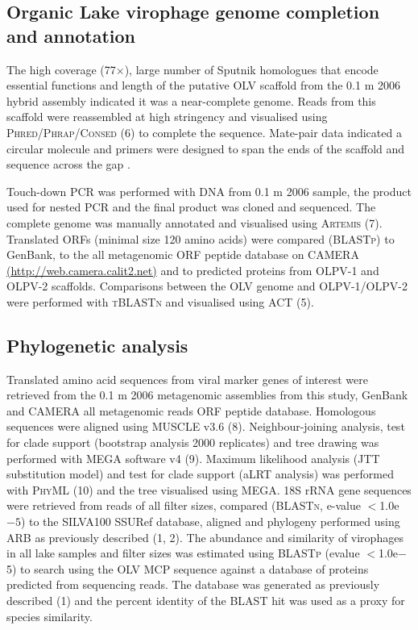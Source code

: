 \subsection[Genome completion and annotation]{Organic Lake virophage genome completion and annotation}
The high coverage (77$\times$), large number of Sputnik homologues that encode essential functions and length of the putative \ac{OLV} scaffold from the 0.1 \textmu{}m 2006 hybrid assembly indicated it was a near-complete genome. 
Reads from this scaffold were reassembled at high stringency and visualised using \textsc{Phred/Phrap/Consed} (6) to complete the sequence. 
Mate-pair data indicated a circular molecule and primers were designed to span the ends of the scaffold and sequence across the gap .
 
Touch-down \ac{PCR} was performed with \textsc{DNA} from 0.1 \textmu{}m 2006 sample, the product used for nested \ac{PCR} and the final product was cloned and sequenced. 
The complete genome was manually annotated and visualised using \textsc{Artemis} (7). 
Translated \acp{ORF} (minimal size 120 amino acids) were compared (\textsc{BLASTp}) to GenBank, to the all metagenomic \ac{ORF} peptide database on \ac{CAMERA} \url{(http://web.camera.calit2.net)} and to predicted proteins from \textsc{OLPV}-1 and \textsc{OLPV}-2 scaffolds. 
Comparisons between the \ac{OLV} genome and \textsc{OLPV}-1/\textsc{OLPV}-2 were performed with \textsc{tBLASTn} and visualised using \ac{ACT} (5). 

\subsection{Phylogenetic analysis}
Translated amino acid sequences from viral marker genes of interest were retrieved from the 0.1 \textmu{}m 2006 metagenomic assemblies from this study, GenBank and \ac{CAMERA} all metagenomic reads \ac{ORF} peptide database. 
Homologous sequences were aligned using \textsc{MUSCLE} v3.6 (8). 
Neighbour-joining analysis, test for clade support (bootstrap analysis 2000 replicates) and tree drawing was performed with \ac{MEGA} software v4 (9). 
Maximum likelihood analysis (\textsc{JTT} substitution model) and test for clade support (aLRT analysis) was performed with \textsc{PhyML} (10) and the tree visualised using \ac{MEGA}. 
18S \ac{rRNA} gene sequences were retrieved from reads of all filter sizes, compared (\textsc{BLASTn}, e-value $<$1.0e$-5$) to the \textsc{SILVA100} SSURef database, aligned and phylogeny performed using \textsc{ARB} as previously described (1, 2). 
The abundance and similarity of virophages in all lake samples and filter sizes was estimated using \textsc{BLASTp} (evalue $<$1.0e$-$5) to search using the \ac{OLV} \ac{MCP} sequence against a database of proteins predicted from sequencing reads. 
The database was generated as previously described (1) and the percent identity of the \textsc{BLAST} hit was used as a proxy for species similarity. 

